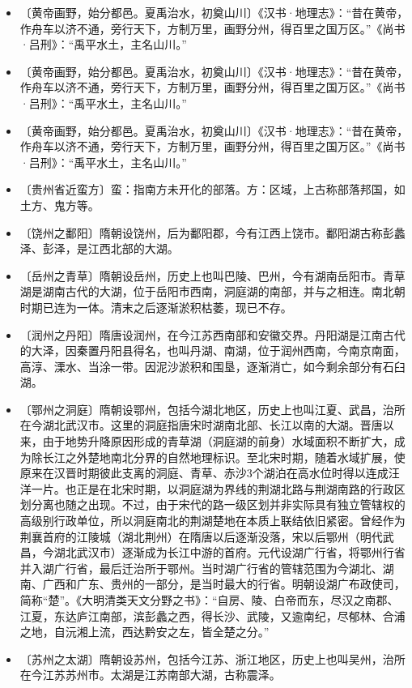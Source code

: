 \documentclass[12pt,UTF-8,openany]{ctexbook}
\begin{document}
\begin{itemize}
    \item〔黄帝画野，始分都邑。夏禹治水，初奠山川〕《汉书·地理志》：“昔在黄帝，作舟车以济不通，旁行天下，方制万里，画野分州，得百里之国万区。”《尚书·吕刑》：“禹平水土，主名山川。”
    \item〔黄帝画野，始分都邑。夏禹治水，初奠山川〕《汉书·地理志》：“昔在黄帝，作舟车以济不通，旁行天下，方制万里，画野分州，得百里之国万区。”《尚书·吕刑》：“禹平水土，主名山川。”
    \item〔黄帝画野，始分都邑。夏禹治水，初奠山川〕《汉书·地理志》：“昔在黄帝，作舟车以济不通，旁行天下，方制万里，画野分州，得百里之国万区。”《尚书·吕刑》：“禹平水土，主名山川。”
    \item〔贵州省近蛮方〕蛮：指南方未开化的部落。方：区域，上古称部落邦国，如土方、鬼方等。
    \item〔饶州之鄱阳〕隋朝设饶州，后为鄱阳郡，今有江西上饶市。鄱阳湖古称彭蠡泽、彭泽，是江西北部的大湖。
    \item〔岳州之青草〕隋朝设岳州，历史上也叫巴陵、巴州，今有湖南岳阳市。青草湖是湖南古代的大湖，位于岳阳市西南，洞庭湖的南部，并与之相连。南北朝时期已连为一体。清末之后逐渐淤积枯萎，现已不存。
    \item〔润州之丹阳〕隋唐设润州，在今江苏西南部和安徽交界。丹阳湖是江南古代的大泽，因秦置丹阳县得名，也叫丹湖、南湖，位于润州西南，今南京南面，高淳、溧水、当涂一带。因泥沙淤积和围垦，逐渐消亡，如今剩余部分有石臼湖。
    \item〔鄂州之洞庭〕隋朝设鄂州，包括今湖北地区，历史上也叫江夏、武昌，治所在今湖北武汉市。这里的洞庭指唐宋时湖南北部、长江以南的大湖。晋唐以来，由于地势升降原因形成的青草湖（洞庭湖的前身）水域面积不断扩大，成为除长江之外楚地南北分界的自然地理标识。至北宋时期，随着水域扩展，使原来在汉晋时期彼此支离的洞庭、青草、赤沙3个湖泊在高水位时得以连成汪洋一片。也正是在北宋时期，以洞庭湖为界线的荆湖北路与荆湖南路的行政区划分离也随之出现。不过，由于宋代的路一级区划并非实际具有独立管辖权的高级别行政单位，所以洞庭南北的荆湖楚地在本质上联结依旧紧密。曾经作为荆襄首府的江陵城（湖北荆州）在隋唐以后逐渐没落，宋以后鄂州（明代武昌，今湖北武汉市）逐渐成为长江中游的首府。元代设湖广行省，将鄂州行省并入湖广行省，最后迁治所于鄂州。当时湖广行省的管辖范围为今湖北、湖南、广西和广东、贵州的一部分，是当时最大的行省。明朝设湖广布政使司，简称“楚”。《大明清类天文分野之书》：“自房、陵、白帝而东，尽汉之南郡、江夏，东达庐江南部，滨彭蠡之西，得长沙、武陵，又逾南纪，尽郁林、合浦之地，自沅湘上流，西达黔安之左，皆全楚之分。”
    \item〔苏州之太湖〕隋朝设苏州，包括今江苏、浙江地区，历史上也叫吴州，治所在今江苏苏州市。太湖是江苏南部大湖，古称震泽。
\end{itemize}
\end{document}
